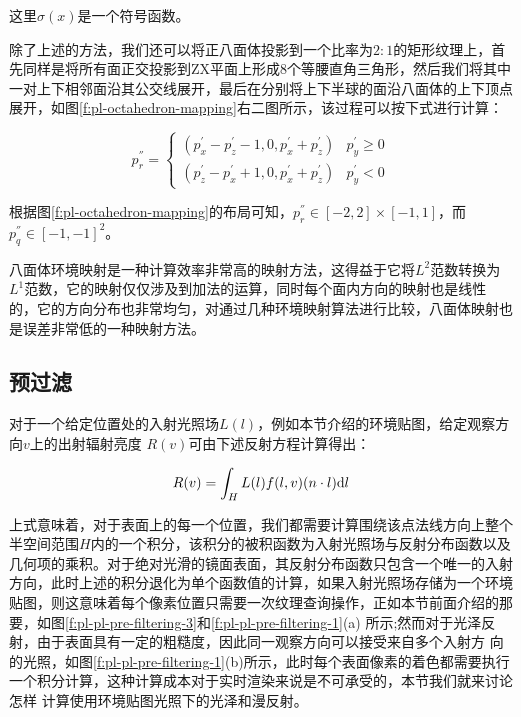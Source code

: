这里$\sigma(x)$是一个符号函数。

除了上述的方法，我们还可以将正八面体投影到一个比率为$2:1$的矩形纹理上，首先同样是将所有面正交投影到ZX平面上形成8个等腰直角三角形，然后我们将其中一对上下相邻面沿其公交线展开，最后在分别将上下半球的面沿八面体的上下顶点展开，如图\ref{f:pl-octahedron-mapping}右二图所示，该过程可以按下式进行计算：

\begin{equation}
	p^{''}_r=\begin{cases}
		(p^{'}_x-p^{'}_z-1,0,p^{'}_x+p^{'}_z) & p^{'}_y\geq 0 \\
		(p^{'}_z-p^{'}_x+1,0,p^{'}_x+p^{'}_z) & p^{'}_y< 0
	\end{cases}
\end{equation}

根据图\ref{f:pl-octahedron-mapping}的布局可知，$p^{''}_r\in[-2,2]\times [-1,1]$，而$p^{''}_q\in [-1,-1]^{2}$。

八面体环境映射是一种计算效率非常高的映射方法，这得益于它将$L^{2}$范数转换为$L^{1}$范数，它的映射仅仅涉及到加法的运算，同时每个面内方向的映射也是线性的，它的方向分布也非常均匀，\cite{a:ASurveyofEfficientRepresentationsforIndependentUnitVectors}对通过几种环境映射算法进行比较，八面体映射也是误差非常低的一种映射方法。




\subsection{预过滤}\label{sec:pl-pre-filtering}
对于一个给定位置处的入射光照场$L(l)$，例如本节介绍的环境贴图，给定观察方向$v$上的出射辐射亮度 $R(v)$可由下述反射方程计算得出：

\begin{equation}\label{e:pl-prefiltering-1}
	R(v)=\int_H L(l)f(l,v)(n\cdot l){\rm d}l
\end{equation}

上式意味着，对于表面上的每一个位置，我们都需要计算围绕该点法线方向上整个半空间范围$H$内的一个积分，该积分的被积函数为入射光照场与反射分布函数以及几何项的乘积。对于绝对光滑的镜面表面，其反射分布函数只包含一个唯一的入射方向，此时上述的积分退化为单个函数值的计算，如果入射光照场存储为一个环境贴图，则这意味着每个像素位置只需要一次纹理查询操作，正如本节前面介绍的那要，如图\ref{f:pl-pl-pre-filtering-3}和\ref{f:pl-pl-pre-filtering-1}(a) 所示;然而对于光泽反射，由于表面具有一定的粗糙度，因此同一观察方向可以接受来自多个入射方 向的光照，如图\ref{f:pl-pl-pre-filtering-1}(b)所示，此时每个表面像素的着色都需要执行一个积分计算，这种计算成本对于实时渲染来说是不可承受的，本节我们就来讨论怎样 计算使用环境贴图光照下的光泽和漫反射。

